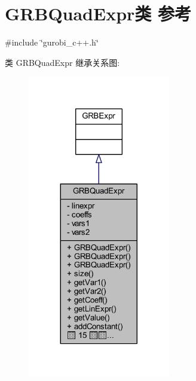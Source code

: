 \hypertarget{classGRBQuadExpr}{}\section{G\+R\+B\+Quad\+Expr类 参考}
\label{classGRBQuadExpr}


{\ttfamily \#include \char`\"{}gurobi\+\_\+c++.\+h\char`\"{}}



类 G\+R\+B\+Quad\+Expr 继承关系图\+:
\nopagebreak
\begin{figure}[H]
\begin{center}
\leavevmode
\includegraphics[width=176pt]{classGRBQuadExpr__inherit__graph}
\end{center}
\end{figure}


